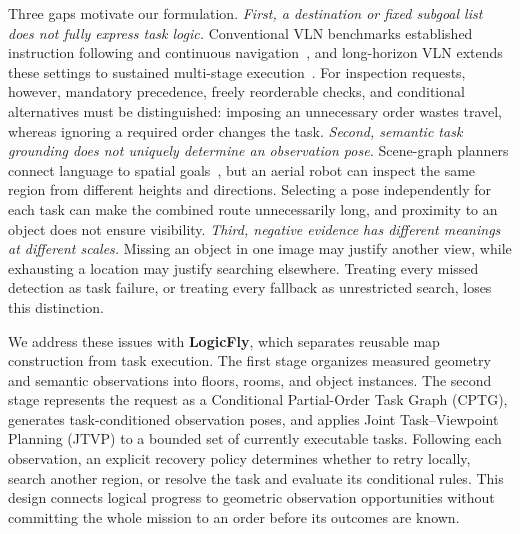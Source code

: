 \documentclass[letterpaper,10pt,journal]{IEEEtran}
\begin{document}
Three gaps motivate our formulation. \emph{First, a destination or fixed subgoal list does not fully express task logic.} Conventional VLN benchmarks established instruction following and continuous navigation~\cite{anderson2018r2r,krantz2020vlnce}, and long-horizon VLN extends these settings to sustained multi-stage execution~\cite{song2024lhvln}. For inspection requests, however, mandatory precedence, freely reorderable checks, and conditional alternatives must be distinguished: imposing an unnecessary order wastes travel, whereas ignoring a required order changes the task. \emph{Second, semantic task grounding does not uniquely determine an observation pose.} Scene-graph planners connect language to spatial goals~\cite{rana2023sayplan,dai2024osgp}, but an aerial robot can inspect the same region from different heights and directions. Selecting a pose independently for each task can make the combined route unnecessarily long, and proximity to an object does not ensure visibility. \emph{Third, negative evidence has different meanings at different scales.} Missing an object in one image may justify another view, while exhausting a location may justify searching elsewhere. Treating every missed detection as task failure, or treating every fallback as unrestricted search, loses this distinction.

We address these issues with \textbf{LogicFly}, which separates reusable map construction from task execution. The first stage organizes measured geometry and semantic observations into floors, rooms, and object instances. The second stage represents the request as a Conditional Partial-Order Task Graph (CPTG), generates task-conditioned observation poses, and applies Joint Task--Viewpoint Planning (JTVP) to a bounded set of currently executable tasks. Following each observation, an explicit recovery policy determines whether to retry locally, search another region, or resolve the task and evaluate its conditional rules. This design connects logical progress to geometric observation opportunities without committing the whole mission to an order before its outcomes are known.
\end{document}
